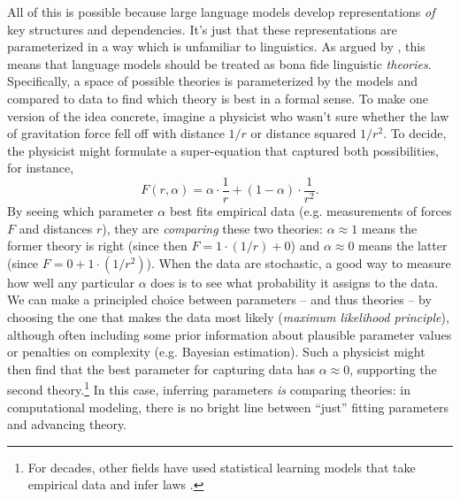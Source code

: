 \documentclass[output=paper,colorlinks,citecolor=brown
]{langscibook}
\begin{document}
 
All of this is possible because large language models develop representations \textit{of} key structures and dependencies. It's just that these representations are parameterized in a way which is unfamiliar to linguistics. As argued by \citet{baroni2022proper}, this means that language models should be treated as bona fide linguistic \textit{theories}. Specifically, a space of possible theories is parameterized by the models and compared to data to find which theory is best in a formal sense. To make one version of the idea concrete, imagine a physicist who wasn't sure whether the law of gravitation force fell off with distance $1/r$ or distance squared $1/r^2$. To decide, the physicist might formulate a super-equation that captured both possibilities, for instance,
$$
F(r,\alpha) = \alpha \cdot \frac{1}{r} + (1-\alpha) \cdot \frac{1}{r^2}.
$$
By seeing which parameter $\alpha$ best fits empirical data (e.g. measurements of forces $F$ and distances $r$), they are \textit{comparing} these two theories: $\alpha\approx 1$ means the former theory is right (since then $F=1\cdot (1/r)+0$) and $\alpha \approx 0$ means the latter (since $F=0+1\cdot(1/r^2)$). When the data are stochastic, a good way to measure how well any particular $\alpha$ does is to see what probability it assigns to the data. We can make a principled choice between parameters -- and thus theories -- by choosing the one that makes the data most likely (\textit{maximum likelihood principle}), although often including some prior information about plausible parameter values or penalties on complexity (e.g. Bayesian estimation). 
Such a physicist might then find that the best parameter for capturing data has $\alpha \approx 0$, supporting the second theory.\footnote{For decades, other fields have used statistical learning models that take empirical data and infer laws \citep{koza1994genetic,langley1983rediscovering,schmidt2009distilling,udrescu2020ai}.} In this case, inferring parameters \textit{is} comparing theories: in computational modeling, there is no bright line between ``just'' fitting parameters and advancing theory.
\end{document}
